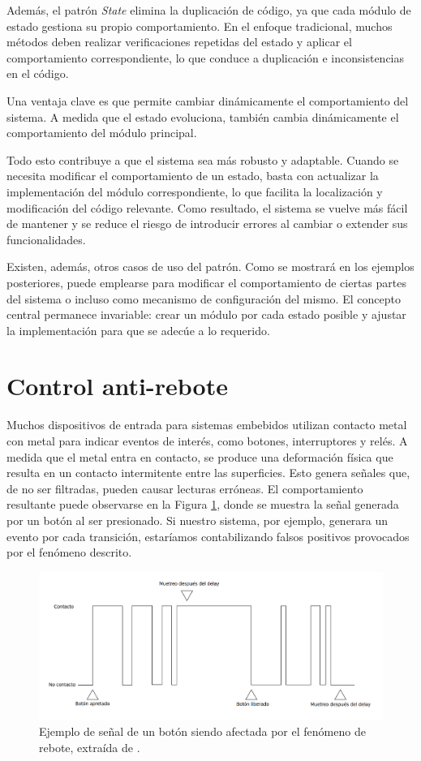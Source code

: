 Además, el patrón \textit{State} elimina la duplicación de código, ya que cada módulo de estado gestiona su propio comportamiento. En el enfoque tradicional, muchos métodos deben realizar verificaciones repetidas del estado y aplicar el comportamiento correspondiente, lo que conduce a duplicación e inconsistencias en el código.

Una ventaja clave es que permite cambiar dinámicamente el comportamiento del sistema. A medida que el estado evoluciona, también cambia dinámicamente el comportamiento del módulo principal.

Todo esto contribuye a que el sistema sea más robusto y adaptable. Cuando se necesita modificar el comportamiento de un estado, basta con actualizar la implementación del módulo correspondiente, lo que facilita la localización y modificación del código relevante. Como resultado, el sistema se vuelve más fácil de mantener y se reduce el riesgo de introducir errores al cambiar o extender sus funcionalidades.

Existen, además, otros casos de uso del patrón. Como se mostrará en los ejemplos posteriores, puede emplearse para modificar el comportamiento de ciertas partes del sistema o incluso como mecanismo de configuración del mismo. El concepto central permanece invariable: crear un módulo por cada estado posible y ajustar la implementación para que se adecúe a lo requerido.
\section{Control anti-rebote}
Muchos dispositivos de entrada para sistemas embebidos utilizan contacto metal con metal para indicar eventos de interés, como botones, interruptores y relés. A medida que el metal entra en contacto, se produce una deformación física que resulta en un contacto intermitente entre las superficies. Esto genera señales que, de no ser filtradas, pueden causar lecturas erróneas. El comportamiento resultante puede observarse en la Figura \ref{botonReboteD}, donde se muestra la señal generada por un botón al ser presionado. Si nuestro sistema, por ejemplo, generara un evento por cada transición, estaríamos contabilizando falsos positivos provocados por el fenómeno descrito.

\begin{figure}[H]
    \centering
    \includegraphics[width=0.9\linewidth]{antirebote.png}
    \caption{Ejemplo de señal de un botón siendo afectada por el fenómeno de rebote, extraída de \citep{douglass}.}
    \label{botonReboteD}
\end{figure}

